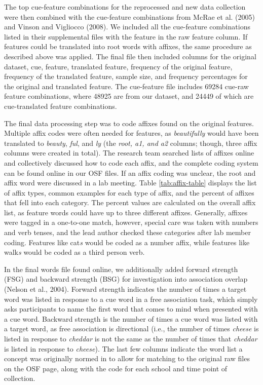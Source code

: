 \documentclass[english,,man]{apa6}
\theoremstyle{definition}
\theoremstyle{definition}
\theoremstyle{definition}
\theoremstyle{remark}
\begin{document}
The top cue-feature combinations for the reprocessed and new data
collection were then combined with the cue-feature combinations from
McRae et al. (2005) and Vinson and Vigliocco (2008). We included all the
cue-feature combinations listed in their supplemental files with the
feature in the raw feature column. If features could be translated into
root words with affixes, the same procedure as described above was
applied. The final file then included columns for the original dataset,
cue, feature, translated feature, frequency of the original feature,
frequency of the translated feature, sample size, and frequency
percentages for the original and translated feature. The cue-feature
file includes 69284 cue-raw feature combinations, where 48925 are from
our dataset, and 24449 of which are cue-translated feature combinations.

The final data processing step was to code affixes found on the original
features. Multiple affix codes were often needed for features, as
\emph{beautifully} would have been translated to \emph{beauty},
\emph{ful}, and \emph{ly} (the \emph{root, a1, and a2} columns; though,
three affix columns were created in total). The research team searched
lists of affixes online and collectively discussed how to code each
affix, and the complete coding system can be found online in our OSF
files. If an affix coding was unclear, the root and affix word were
discussed in a lab meeting. Table \ref{tab:affix-table} displays the
list of affix types, common examples for each type of affix, and the
percent of affixes that fell into each category. The percent values are
calculated on the overall affix list, as feature words could have up to
three different affixes. Generally, affixes were tagged in a one-to-one
match, however, special care was taken with numbers and verb tenses, and
the lead author checked these categories after lab member coding.
Features like cat\emph{s} would be coded as a number affix, while
features like walk\emph{s} would be coded as a third person verb.

In the final words file found online, we additionally added forward
strength (FSG) and backward strength (BSG) for investigation into
association overlap (Nelson et al., 2004). Forward strength indicates
the number of times a target word was listed in response to a cue word
in a free association task, which simply asks participants to name the
first word that comes to mind when presented with a cue word. Backward
strength is the number of times a cue word was listed with a target
word, as free association is directional (i.e., the number of times
\emph{cheese} is listed in response to \emph{cheddar} is not the same as
the number of times that \emph{cheddar} is listed in response to
\emph{cheese}). The last few columns indicate the word list a concept
was originally normed in to allow for matching to the original raw files
on the OSF page, along with the code for each school and time point of
collection.
\end{document}
